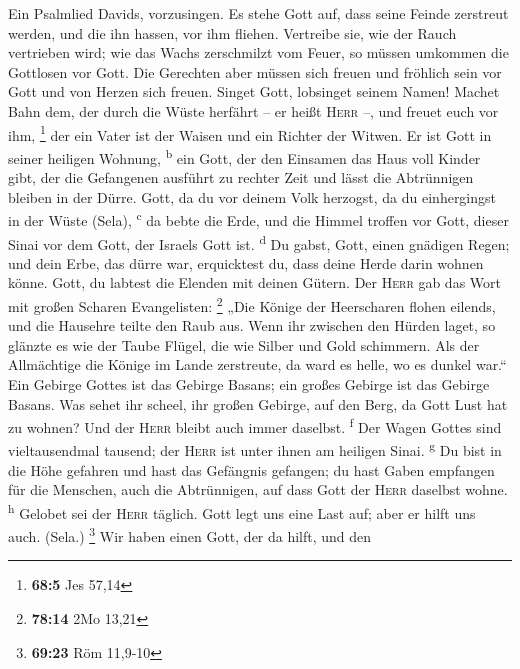  Ein Psalmlied Davids, vorzusingen.  Es
stehe Gott auf, dass seine Feinde zerstreut werden, und die ihn hassen,
vor ihm fliehen.  Vertreibe sie, wie der Rauch vertrieben
wird; wie das Wachs zerschmilzt vom Feuer, so müssen umkommen die
Gottlosen vor Gott.  Die Gerechten aber müssen sich freuen
und fröhlich sein vor Gott und von Herzen sich freuen. 
Singet Gott, lobsinget seinem Namen! Machet Bahn dem, der durch die
Wüste herfährt -- er heißt \textsc{Herr} --, und freuet euch vor ihm,
\footnote{\textbf{68:5} Jes 57,14}  der ein Vater ist der
Waisen und ein Richter der Witwen. Er ist Gott in seiner heiligen
Wohnung, \textsuperscript{b}  ein Gott, der den Einsamen
das Haus voll Kinder gibt, der die Gefangenen ausführt zu rechter Zeit
und lässt die Abtrünnigen bleiben in der Dürre.  Gott, da
du vor deinem Volk herzogst, da du einhergingst in der Wüste (Sela),
\textsuperscript{c}  da bebte die Erde, und die Himmel
troffen vor Gott, dieser Sinai vor dem Gott, der Israels Gott ist.
\textsuperscript{d}  Du gabst, Gott, einen gnädigen
Regen; und dein Erbe, das dürre war, erquicktest du, 
dass deine Herde darin wohnen könne. Gott, du labtest die Elenden mit
deinen Gütern.  Der \textsc{Herr} gab das Wort mit großen
Scharen Evangelisten: \footnote{\textbf{78:14} 2Mo 13,21}
 „Die Könige der Heerscharen flohen eilends, und die
Hausehre teilte den Raub aus.  Wenn ihr zwischen den
Hürden laget, so glänzte es wie der Taube Flügel, die wie Silber und
Gold schimmern.  Als der Allmächtige die Könige im Lande
zerstreute, da ward es helle, wo es dunkel war.``  Ein
Gebirge Gottes ist das Gebirge Basans; ein großes Gebirge ist das
Gebirge Basans.  Was sehet ihr scheel, ihr großen
Gebirge, auf den Berg, da Gott Lust hat zu wohnen? Und der \textsc{Herr}
bleibt auch immer daselbst. \textsuperscript{f}  Der
Wagen Gottes sind vieltausendmal tausend; der \textsc{Herr} ist unter
ihnen am heiligen Sinai. \textsuperscript{g}  Du bist in
die Höhe gefahren und hast das Gefängnis gefangen; du hast Gaben
empfangen für die Menschen, auch die Abtrünnigen, auf dass Gott der
\textsc{Herr} daselbst wohne. \textsuperscript{h} 
Gelobet sei der \textsc{Herr} täglich. Gott legt uns eine Last auf; aber
er hilft uns auch. (Sela.) \footnote{\textbf{69:23} Röm 11,9-10}
 Wir haben einen Gott, der da hilft, und den

